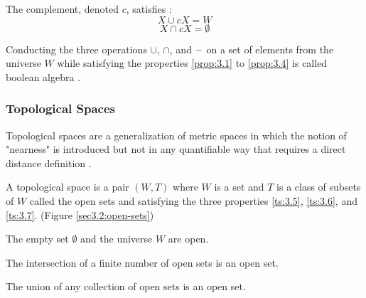 \documentclass[a4paper,11pt,oneside]{article}
\newcommand{\minus}{\scalebox{0.9}[1.0]{$-$}} %
\begin{document}
\begin{property}
	\label{prop:3.4}
	The complement, denoted $c$, satisfies \cite{mansfield_1987}:
	\begin{equation*}	
		X \cup cX = W
	\end{equation*}
	\begin{equation*}
		X \cap cX = \emptyset
	\end{equation*}
\end{property}


    
\begin{definition}
	Conducting the three operations $\cup$, $\cap$, and $\minus$ on a set of elements from the universe $W$ while satisfying the properties \eqref{prop:3.1} to \eqref{prop:3.4} is called boolean algebra \cite{Requicha1978MathematicalFO}.
\end{definition}
    
\subsubsection{Topological Spaces}
    
Topological spaces are a generalization of metric spaces in which the notion of "nearness" is introduced but not in any quantifiable way that requires a direct distance definition \cite{mansfield_1987}.
    
\begin{definition}
	A topological space is a pair $(W, T)$ where $W$ is a set and $T$ is a class of subsets of $W$ called the open sets and satisfying the three properties \ref{ts:3.5}, \ref{ts:3.6}, and \ref{ts:3.7}. (Figure \ref{sec3.2:open-sets})
	\begin{property}
		\label{ts:3.5}
		The empty set $\emptyset$ and the universe $W$ are open.\cite{mansfield_1987}
	\end{property}
	\begin{property}
		\label{ts:3.6}
		The intersection of a finite number of open sets is an open set. \cite{mansfield_1987}
	\end{property}
	\begin{property}
		\label{ts:3.7}
		The union of any collection of open sets is an open set. \cite{mansfield_1987}
	\end{property}
\end{definition}
\end{document}
